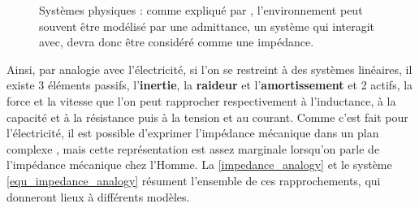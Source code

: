 \documentclass[12pt, a4paper]{article} %
\begin{document}
\begin{figure}[h]
	\centering
	
	
	\caption{Systèmes physiques : comme expliqué par \cite{hogan_impedance_1985}, l'environnement peut souvent être modélisé par une admittance, un système qui interagit avec, devra donc être considéré comme une impédance.} %
	\label{mec_impedance} %
\end{figure}

Ainsi, par analogie avec l'électricité, si l'on se restreint à des systèmes linéaires, il existe 3 éléments passifs, l'\textbf{inertie}, la \textbf{raideur} et l'\textbf{amortissement} et 2 actifs, la force et la vitesse que l'on peut rapprocher respectivement à l'inductance, à la capacité et à la résistance puis à la tension et au courant. Comme c'est fait pour l'électricité, il est possible d'exprimer l'impédance mécanique dans un plan complexe \citep{hondori_method_2009}, mais cette représentation est assez marginale lorsqu'on parle de l'impédance mécanique chez l'Homme. La \cref{impedance_analogy} et le système \eqref{equ_impedance_analogy} résument l'ensemble de ces rapprochements, qui donneront lieux à différents modèles.
\end{document}
